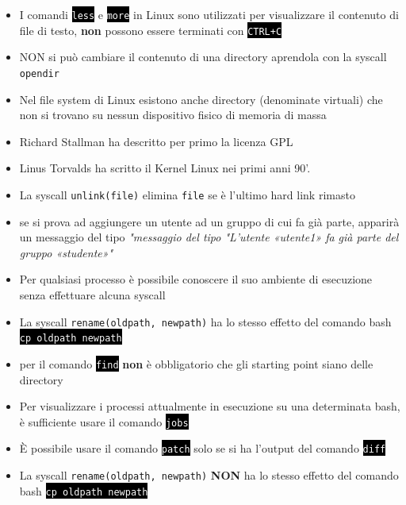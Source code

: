\documentclass[12pt, letterpaper]{article}
\newcommand{\code}[1]{\colorbox{light-gray}{\texttt{#1}}}
\newcommand{\shelll}[1]{\colorbox{black}{\textcolor{white}{\texttt{#1}}}}
\begin{document}
\begin{itemize}
    \item I comandi \shelll{less} e \shelll{more} in Linux sono utilizzati per visualizzare il contenuto di file di testo, \textbf{non} possono essere 
    terminati con \shelll{CTRL+C}
    \item NON si può cambiare il contenuto di una directory aprendola con la syscall \code{opendir}
    \item Nel file system di Linux esistono anche directory (denominate virtuali) che non si trovano su nessun dispositivo fisico di memoria di massa
    \item Richard Stallman ha descritto per primo la licenza GPL
    \item Linus Torvalds ha scritto il Kernel Linux nei primi anni 90'.
    \item La syscall \code{unlink(file)} elimina \code{file} se è l'ultimo hard link rimasto
    \item se  si prova ad aggiungere un utente ad un gruppo di cui fa già parte, apparirà un messaggio 
    del tipo \textit{"messaggio del tipo "L'utente «utente1» fa già parte del gruppo «studente»"}
    \item Per qualsiasi processo è possibile conoscere il suo ambiente di esecuzione senza effettuare alcuna syscall
    \item La syscall \code{rename(oldpath, newpath)} ha lo stesso effetto del comando bash \\\shelll{cp oldpath newpath}
    \item per il comando \shelll{find} \textbf{non} è obbligatorio che gli starting point siano delle directory
    \item Per visualizzare i processi attualmente in esecuzione su una determinata bash, è sufficiente usare il comando \shelll{jobs}
    \item È possibile usare il comando  \shelll{patch} solo se si ha l'output del comando  \shelll{diff}
    \item La syscall \code{rename(oldpath, newpath)} \textbf{NON} ha lo stesso effetto del comando bash \shelll{cp oldpath newpath}
\end{itemize}
\end{document}
